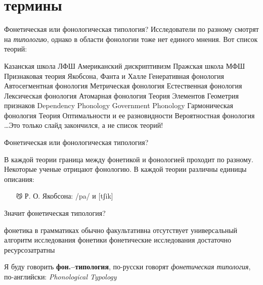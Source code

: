\section{термины}
\begin{frame}{Фонетическая или фонологическая типология?}
\medskip
Исследователи по разному смотрят на \textit{типологию}, однако в области фонологии тоже нет единого мнения. Вот список теорий:
\tiny
\begin{itemize}
\mytem Казанская школа
\mytem ЛФШ
\mytem Американский дискриптивизм
\mytem Пражская школа
\mytem МФШ
\mytem Признаковая теория Якобсона, Фанта и Халле
\mytem Генеративная фонология
\mytem Автосегментная фонология
\mytem Метрическая фонология
\mytem Естественная фонология
\mytem Лексическая фонология
\mytem Атомарная фонология
\mytem Теория Элементов
\mytem Геометрия признаков
\mytem Dependency Phonology
\mytem Government Phonology
\mytem Гармоническая фонология
\mytem Теория Оптимальности и ее разновидности
\mytem Вероятностная фонология
\mytem \ldots \hfill {\large Это только слайд закончился, а не список теорий!}
\end{itemize}
\normalsize
\end{frame}
\begin{frame}{Фонетическая или фонологическая типология?}
\begin{itemize}
\mytem В каждой теории граница между фонетикой и фонологией проходит по разному.  Некоторые ученые отрицают фонологию.
\mytem В каждой теории различны единицы описания:
\begin{itemize}
\mytem в МФШ фонемы, в автосегментной фонологии признаки
\mytem в Теории Оптимальности только ограничения, в генеративной фонологии только правила, в когнитивной фонологии, Element Theory и Goverment Phonology  только образцы/прототипы.
\item[\texttt{😼}] Р. О. Якобсона: /pa/ и [tʃik]
\end{itemize}
\end{itemize}
Значит фонетическая типология?
\begin{itemize}
\mytem фонетика в грамматиках обычно факультативна
\mytem отсутствует универсальный алгоритм исследования фонетики
\mytem фонетические исследования достаточно ресурсозатратны 
\end{itemize}
Я буду говорить \textbf{фон.–типология}, по-русски говорят \textit{фонетическая типология}, по-английски: \textit{Phonological Typology}\medskip
\end{frame}

